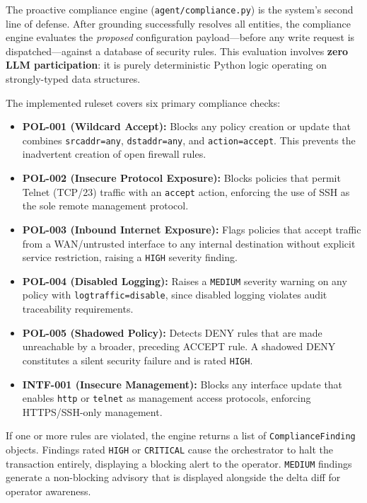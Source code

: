 The proactive compliance engine (\texttt{agent/compliance.py}) is the system's second line of defense. After grounding successfully resolves all entities, the compliance engine evaluates the \emph{proposed} configuration payload—before any write request is dispatched—against a database of security rules. This evaluation involves \textbf{zero LLM participation}: it is purely deterministic Python logic operating on strongly-typed data structures.

The implemented ruleset covers six primary compliance checks:

\begin{itemize}
    \item \textbf{POL-001 (Wildcard Accept):} Blocks any policy creation or update that combines \texttt{srcaddr=any}, \texttt{dstaddr=any}, and \texttt{action=accept}. This prevents the inadvertent creation of open firewall rules.
    \item \textbf{POL-002 (Insecure Protocol Exposure):} Blocks policies that permit Telnet (TCP/23) traffic with an \texttt{accept} action, enforcing the use of SSH as the sole remote management protocol.
    \item \textbf{POL-003 (Inbound Internet Exposure):} Flags policies that accept traffic from a WAN/untrusted interface to any internal destination without explicit service restriction, raising a \texttt{HIGH} severity finding.
    \item \textbf{POL-004 (Disabled Logging):} Raises a \texttt{MEDIUM} severity warning on any policy with \texttt{logtraffic=disable}, since disabled logging violates audit traceability requirements.
    \item \textbf{POL-005 (Shadowed Policy):} Detects DENY rules that are made unreachable by a broader, preceding ACCEPT rule. A shadowed DENY constitutes a silent security failure and is rated \texttt{HIGH}.
    \item \textbf{INTF-001 (Insecure Management):} Blocks any interface update that enables \texttt{http} or \texttt{telnet} as management access protocols, enforcing HTTPS/SSH-only management.
\end{itemize}

If one or more rules are violated, the engine returns a list of \texttt{ComplianceFinding} objects. Findings rated \texttt{HIGH} or \texttt{CRITICAL} cause the orchestrator to halt the transaction entirely, displaying a blocking alert to the operator. \texttt{MEDIUM} findings generate a non-blocking advisory that is displayed alongside the delta diff for operator awareness.


